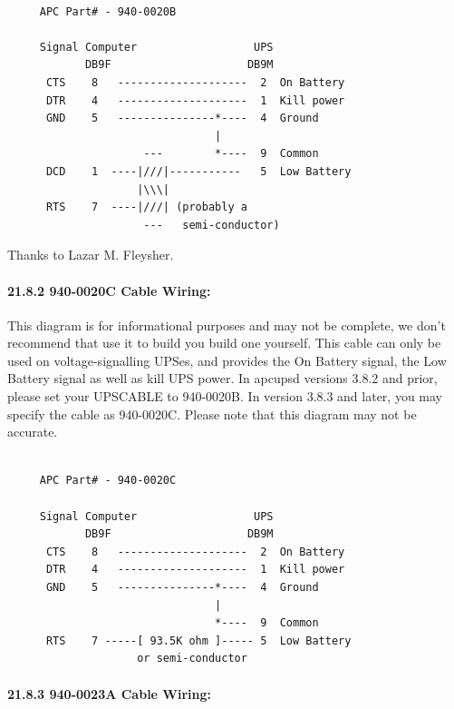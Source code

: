 \footnotesize
\begin{verbatim}
     
     APC Part# - 940-0020B
     
     Signal Computer                  UPS
            DB9F                     DB9M
      CTS    8   --------------------  2  On Battery
      DTR    4   --------------------  1  Kill power
      GND    5   ---------------*----  4  Ground
                                |
                     ---        *----  9  Common
      DCD    1  ----|///|-----------   5  Low Battery
                    |\\\|
      RTS    7  ----|///| (probably a
                     ---   semi-conductor)
\end{verbatim}
\normalsize

Thanks to Lazar M. Fleysher. 

\label{940_002d0020C-Cable-Wiring}

\paragraph*{21.8.2 940-0020C Cable Wiring:}

\label{index-Cables-204}
This diagram is for informational purposes and may not be complete, we don't
recommend that use it to build you build one yourself.  This cable can only be
used on voltage-signalling UPSes, and provides the On Battery signal, the Low
Battery signal as well as kill UPS power. In apcupsd versions 3.8.2 and prior,
please set your UPSCABLE to 940-0020B. In version 3.8.3 and later, you may
specify the cable as 940-0020C. Please note that this diagram may not be
accurate. 

\footnotesize
\begin{verbatim}
     
     APC Part# - 940-0020C
     
     Signal Computer                  UPS
            DB9F                     DB9M
      CTS    8   --------------------  2  On Battery
      DTR    4   --------------------  1  Kill power
      GND    5   ---------------*----  4  Ground
                                |
                                *----  9  Common
      RTS    7 -----[ 93.5K ohm ]----- 5  Low Battery
                    or semi-conductor
\end{verbatim}
\normalsize

\label{940_002d0023A-Cable-Wiring}

\paragraph*{21.8.3 940-0023A Cable Wiring:}

